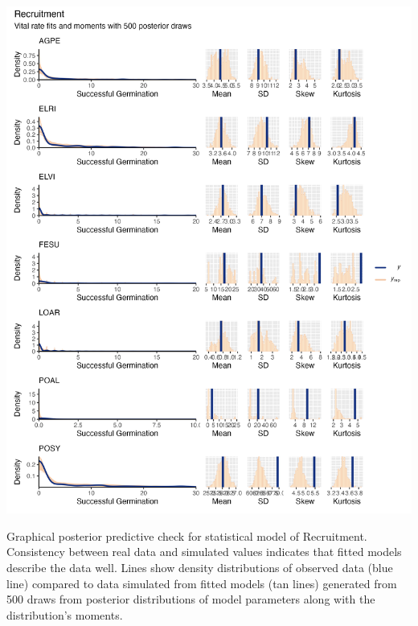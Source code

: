 \documentclass[lineno, sn-basic]{sn-jnl}%
\begin{document}
\begin{myfigure}[H]
	\centering
	\includegraphics[width = \linewidth]{stosbyspecies_densplot.png}
	\caption[Graphical posterior predictive check for statistical model of Recruitment]{Graphical posterior predictive check for statistical model of Recruitment. Consistency between real data and simulated values indicates that fitted models describe the data well. Lines show density distributions of observed data (blue line) compared to data simulated from fitted models (tan lines) generated from 500 draws from posterior distributions of model parameters along with the distribution's moments.}
\end{myfigure}
\end{document}
